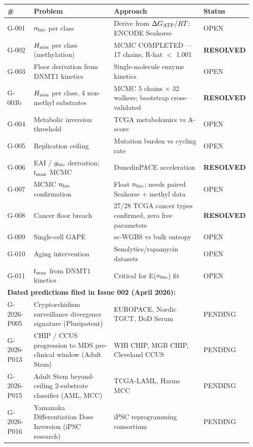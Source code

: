 \documentclass[12pt,a4paper]{article}
\begin{document}
\begin{center}
\renewcommand{\arraystretch}{1.2}
\begin{tabular}{p{1.4cm}p{4.2cm}p{4.8cm}p{2.5cm}}
\toprule
\textbf{\#} & \textbf{Problem} & \textbf{Approach} & \textbf{Status} \\
\midrule
G-001 & $n_{\rm bio}$ per class & Derive from $\Delta G_{\rm ATP}/RT$; ENCODE Seahorse & OPEN \\
G-002 & $H_{\rm min}$ per class (methylation) & MCMC COMPLETED --- 17 chains, R-hat $<$ 1.001 & \textbf{RESOLVED} \\
G-003 & Floor derivation from DNMT1 kinetics & Single-molecule enzyme kinetics & OPEN \\
G-003b & $H_{\rm min}$ per class, 4 non-methyl substrates & MCMC 5 chains $\times$ 32 walkers; bootstrap cross-validated & \textbf{RESOLVED} \\
G-004 & Metabolic inversion threshold & TCGA metabolomics vs A-score & OPEN \\
G-005 & Replication ceiling & Mutation burden vs cycling rate & OPEN \\
G-006 & EAI / $g_{\rm bio}$ derivation; $t_{\rm max}$ MCMC & DunedinPACE acceleration & \textbf{RESOLVED} \\
G-007 & MCMC $n_{\rm bio}$ confirmation & Float $n_{\rm bio}$; needs paired Seahorse + methyl data & OPEN \\
G-008 & Cancer floor breach & 27/28 TCGA cancer types confirmed, zero free parameters & \textbf{RESOLVED} \\
G-009 & Single-cell GAPE & sc-WGBS vs bulk entropy & OPEN \\
G-010 & Aging intervention & Senolytics/rapamycin datasets & OPEN \\
G-011 & $t_{\rm max}$ from DNMT1 kinetics & Critical for E($a_{\rm bio}$) fit & OPEN \\
\midrule
\multicolumn{4}{l}{\textbf{Dated predictions filed in Issue 002 (April 2026):}} \\
G-2026-P005 & Cryptorchidism surveillance divergence signature (Pluripotent) & EUROPACE, Nordic TGCT, DoD Serum & PENDING \\
G-2026-P013 & CHIP / CCUS progression to MDS pre-clinical window (Adult Stem) & WHI CHIP, MGB CHIP, Cleveland CCUS & PENDING \\
G-2026-P015 & Adult Stem beyond-ceiling 2-substrate classifier (AML, MCC) & TCGA-LAML, Harms MCC & PENDING \\
G-2026-P016 & Yamanaka Differentiation Dose Inversion (iPSC research) & iPSC reprogramming consortium & PENDING \\

\end{tabular}
\end{center}
\end{document}
